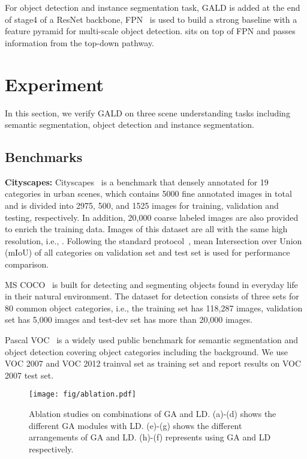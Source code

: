 \documentclass{bmvc2k}
\begin{document}
For object detection and instance segmentation task, GALD is added at the end of stage4 of a ResNet backbone, FPN~\cite{fpn} is used to build a strong baseline with a feature pyramid for multi-scale object detection.  sits on top of FPN and passes information from the top-down pathway.

 \section{Experiment}
In this section, we verify GALD on three scene understanding tasks including semantic segmentation, object detection and instance segmentation. 



\subsection{Benchmarks} 
\textbf{Cityscapes:} Cityscapes~\cite{Cityscapes} is a benchmark that densely annotated for 19 categories in urban scenes, which contains 5000 fine annotated images in total and is divided into 2975, 500, and 1525 images for training, validation and testing, respectively. In addition, 20,000 coarse labeled images are also provided to enrich the training data. Images of this dataset are all with the same high resolution, i.e., . Following the standard protocol~\cite{Cityscapes}, mean Intersection over Union (mIoU) of all categories on validation set and test set is used for performance comparison. 

 MS COCO~\cite{COCO_dataset} is built for detecting and segmenting objects found in everyday life in their natural environment. The dataset for detection consists of three sets for 80 common object categories, i.e., the training set has 118,287 images, validation set has 5,000 images and test-dev set has more than 20,000 images.

 Pascal VOC~\cite{VOC} is a widely used public benchmark for semantic segmentation and object detection covering  object categories including the background. We use VOC 2007 and VOC 2012 trainval set as training set and report results on VOC 2007 test set. 

\begin{figure*}
\centering
\texttt{[image: fig/ablation.pdf]}
\caption{Ablation studies on combinations of GA and LD. (a)-(d) shows the different GA modules with LD. (e)-(g) shows the different arrangements of GA and LD. (h)-(f) represents using GA and LD respectively.
}
\label{fig:ablation}
\end{figure*}
\end{document}
